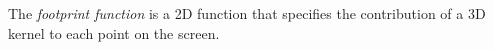The \textit{footprint function} is a 2D function 
that specifies the contribution of a 3D kernel to 
each point on the screen.


